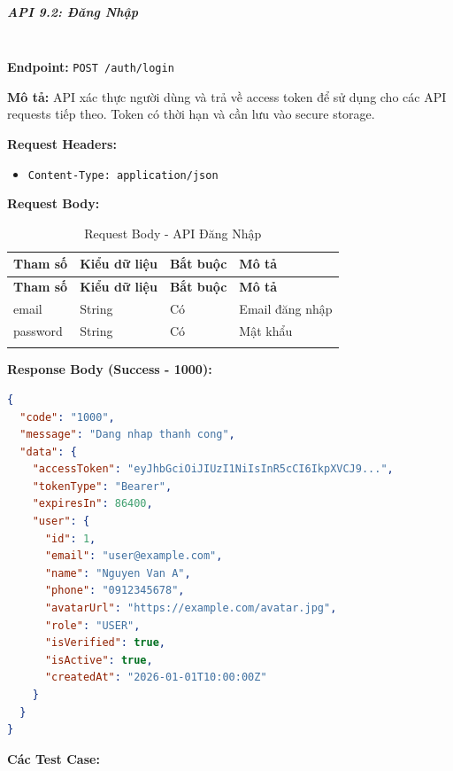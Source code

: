 \normalsize

\subparagraph{API 9.2: Đăng Nhập}~\\

\textbf{Endpoint:} \texttt{POST /auth/login}

\textbf{Mô tả:} API xác thực người dùng và trả về access token để sử dụng cho các API requests tiếp theo. Token có thời hạn và cần lưu vào secure storage.

\textbf{Request Headers:}
\begin{itemize}
    \item \texttt{Content-Type: application/json}
\end{itemize}

\textbf{Request Body:}

\small
\begin{longtable}{|>{\raggedright\arraybackslash}p{3.5cm}|>{\raggedright\arraybackslash}p{2.5cm}|>{\raggedright\arraybackslash}p{2cm}|>{\raggedright\arraybackslash}p{5.5cm}|}
\hline
\textbf{Tham số} & \textbf{Kiểu dữ liệu} & \textbf{Bắt buộc} & \textbf{Mô tả} \\
\hline
\endfirsthead
\hline
\textbf{Tham số} & \textbf{Kiểu dữ liệu} & \textbf{Bắt buộc} & \textbf{Mô tả} \\
\hline
\endhead
email & String & Có & Email đăng nhập \\
\hline
password & String & Có & Mật khẩu \\
\hline
\caption{Request Body - API Đăng Nhập}
\end{longtable}

\textbf{Response Body (Success - 1000):}

\begin{lstlisting}[language=json, caption=Response thanh cong API 9.2]
{
  "code": "1000",
  "message": "Dang nhap thanh cong",
  "data": {
    "accessToken": "eyJhbGciOiJIUzI1NiIsInR5cCI6IkpXVCJ9...",
    "tokenType": "Bearer",
    "expiresIn": 86400,
    "user": {
      "id": 1,
      "email": "user@example.com",
      "name": "Nguyen Van A",
      "phone": "0912345678",
      "avatarUrl": "https://example.com/avatar.jpg",
      "role": "USER",
      "isVerified": true,
      "isActive": true,
      "createdAt": "2026-01-01T10:00:00Z"
    }
  }
}
\end{lstlisting}

\textbf{Các Test Case:}

